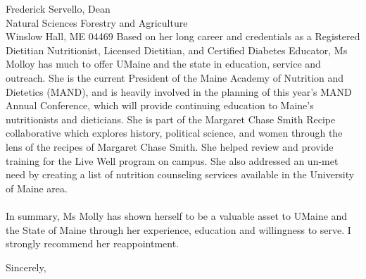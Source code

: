 \documentclass[a4paper,12pt]{letter}
\begin{document}
\begin{letter}{Frederick Servello, Dean\\Natural Sciences Forestry and Agriculture\\Winslow Hall, ME 04469}
Based on her long career and credentials as a Registered Dietitian Nutritionist, Licensed Dietitian, and Certified Diabetes Educator, Ms Molloy has much to offer UMaine and the state in education, service and outreach. She is the current President of the Maine Academy of Nutrition and Dietetics (MAND), and is heavily involved in the planning of this year's MAND Annual Conference, which will provide continuing education to Maine's nutritionists and dieticians. She is part of the Margaret Chase Smith Recipe collaborative which explores history, political science, and women through the lens of the recipes of Margaret Chase Smith. She helped review and provide training for the Live Well program on campus.  She also addressed an un-met need by creating a list of nutrition counseling services available in the University of Maine area.  \\~\\
In summary, Ms Molly has shown herself to be a valuable asset to UMaine and the State of Maine through her experience, education and willingness to serve. I strongly recommend her reappointment. 





\closing{Sincerely,} %
\end{letter}
\end{document}
